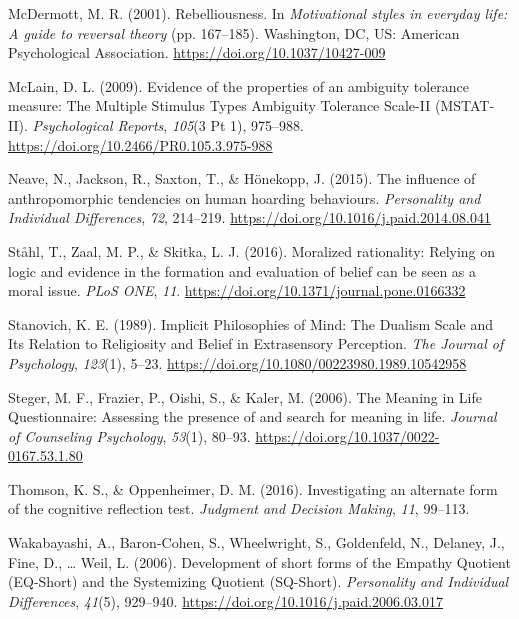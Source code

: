 \documentclass[
  letterpaper,
]{scrbook}
\newlength{\cslhangindent}
\newenvironment{CSLReferences}[2] %
 {\begin{list}{}{%
  \setlength{\itemindent}{0pt}
  \setlength{\leftmargin}{0pt}
  \setlength{\parsep}{0pt}
  \ifodd #1
   \setlength{\leftmargin}{\cslhangindent}
   \setlength{\itemindent}{-1\cslhangindent}
  \fi
  \setlength{\itemsep}{#2\baselineskip}}}
 {\end{list}}
\begin{document}
\begin{CSLReferences}{1}{0}
McDermott, M. R. (2001). Rebelliousness. In \emph{Motivational styles in
everyday life: {A} guide to reversal theory} (pp. 167--185).
{Washington, DC, US}: {American Psychological Association}.
\url{https://doi.org/10.1037/10427-009}

McLain, D. L. (2009). Evidence of the properties of an ambiguity
tolerance measure: The {Multiple Stimulus Types Ambiguity Tolerance
Scale-II} ({MSTAT-II}). \emph{Psychological Reports}, \emph{105}(3 Pt
1), 975--988. \url{https://doi.org/10.2466/PR0.105.3.975-988}

Neave, N., Jackson, R., Saxton, T., \& Hönekopp, J. (2015). The
influence of anthropomorphic tendencies on human hoarding behaviours.
\emph{Personality and Individual Differences}, \emph{72}, 214--219.
\url{https://doi.org/10.1016/j.paid.2014.08.041}

Ståhl, T., Zaal, M. P., \& Skitka, L. J. (2016). Moralized rationality:
{Relying} on logic and evidence in the formation and evaluation of
belief can be seen as a moral issue. \emph{PLoS ONE}, \emph{11}.
\url{https://doi.org/10.1371/journal.pone.0166332}

Stanovich, K. E. (1989). Implicit {Philosophies} of {Mind}: {The Dualism
Scale} and {Its Relation} to {Religiosity} and {Belief} in {Extrasensory
Perception}. \emph{The Journal of Psychology}, \emph{123}(1), 5--23.
\url{https://doi.org/10.1080/00223980.1989.10542958}

Steger, M. F., Frazier, P., Oishi, S., \& Kaler, M. (2006). The
{Meaning} in {Life Questionnaire}: {Assessing} the presence of and
search for meaning in life. \emph{Journal of Counseling Psychology},
\emph{53}(1), 80--93. \url{https://doi.org/10.1037/0022-0167.53.1.80}

Thomson, K. S., \& Oppenheimer, D. M. (2016). Investigating an alternate
form of the cognitive reflection test. \emph{Judgment and Decision
Making}, \emph{11}, 99--113.

Wakabayashi, A., Baron-Cohen, S., Wheelwright, S., Goldenfeld, N.,
Delaney, J., Fine, D., \ldots{} Weil, L. (2006). Development of short
forms of the {Empathy Quotient} ({EQ-Short}) and the {Systemizing
Quotient} ({SQ-Short}). \emph{Personality and Individual Differences},
\emph{41}(5), 929--940. \url{https://doi.org/10.1016/j.paid.2006.03.017}


\end{CSLReferences}
\end{document}
